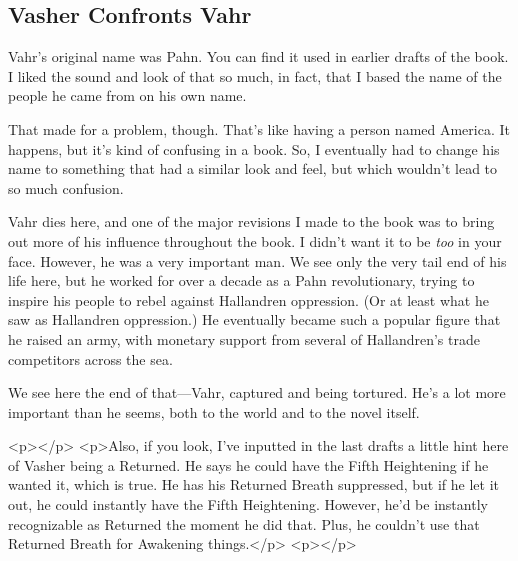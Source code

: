 \subsection*{Vasher Confronts Vahr}

Vahr’s original name was Pahn. You can find it used in earlier drafts of the book. I liked the sound and look of that so much, in fact, that I based the name of the people he came from on his own name.

That made for a problem, though. That’s like having a person named America. It happens, but it’s kind of confusing in a book. So, I eventually had to change his name to something that had a similar look and feel, but which wouldn’t lead to so much confusion.

Vahr dies here, and one of the major revisions I made to the book was to bring out more of his influence throughout the book. I didn’t want it to be \textit{too} in your face. However, he was a very important man. We see only the very tail end of his life here, but he worked for over a decade as a Pahn revolutionary, trying to inspire his people to rebel against Hallandren oppression. (Or at least what he saw as Hallandren oppression.) He eventually became such a popular figure that he raised an army, with monetary support from several of Hallandren’s trade competitors across the sea.

We see here the end of that—Vahr, captured and being tortured. He’s a lot more important than he seems, both to the world and to the novel itself.



<p></p>
<p>Also, if you look, I’ve inputted in the last drafts a little hint here of Vasher being a Returned. He says he could have the Fifth Heightening if he wanted it, which is true. He has his Returned Breath suppressed, but if he let it out, he could instantly have the Fifth Heightening. However, he’d be instantly recognizable as Returned the moment he did that. Plus, he couldn’t use that Returned Breath for Awakening things.</p>
<p></p>



